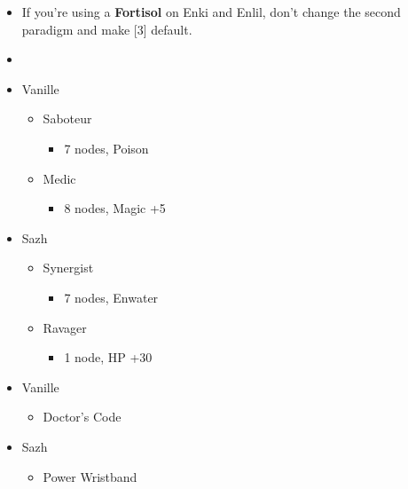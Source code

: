 \begin{menu}
		\begin{itemize}
			\paradigm
			\begin{itemize}
				\item If you're using a \textbf{Fortisol} on Enki and Enlil, don't change the second paradigm and  make [3] default.
				\item {}%
				      {\paradigmline[1]{\textit{\rav}}{\textit{\com}}{}}%
				      {\paradigmline{\med}{(\syn)}{}}%
				      {\paradigmline{\sab}{\syn}{}}%
				      {\paradigmline{\rav}{\rav}{}}%
				      {\paradigmline{[\sab]}{(\rav)}{}}%
				      {\paradigmline{[\sab]}{\com}{}}
			\end{itemize}
			\crystarium
			\begin{itemize}
				\item Vanille
				      \begin{itemize}
					      \item Saboteur
					            \begin{itemize}
						            \item 7 nodes, Poison
					            \end{itemize}
					      \item Medic
					            \begin{itemize}
						            \item 8 nodes, Magic +5
					            \end{itemize}
				      \end{itemize}
				\item Sazh
				      \begin{itemize}
					      \item Synergist
					            \begin{itemize}
						            \item 7 nodes, Enwater
					            \end{itemize}
					      \item Ravager
					            \begin{itemize}
						            \item 1 node, HP +30
					            \end{itemize}
				      \end{itemize}
			\end{itemize}
			\equip
			\begin{itemize}
				\item Vanille
				      \begin{itemize}
					      \item Doctor's Code
				      \end{itemize}
				\item Sazh
				      \begin{itemize}
					      \item Power Wristband
				      \end{itemize}
			\end{itemize}
		\end{itemize}
\end{menu}

